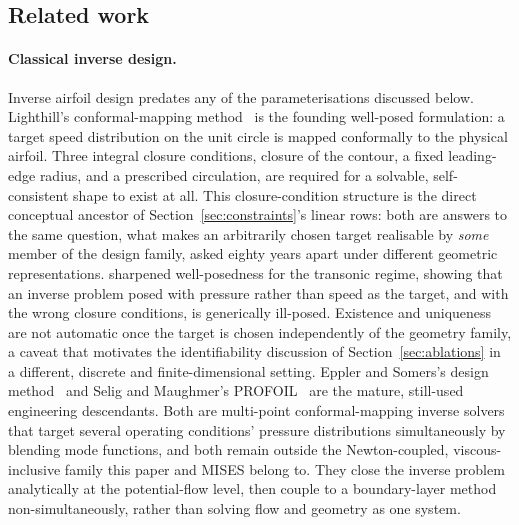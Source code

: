 \subsection{Related work}
\label{sec:related}

\paragraph{Classical inverse design.} Inverse airfoil design predates any of
the parameterisations discussed below. Lighthill's conformal-mapping
method~\citep{lighthill1945new} is the founding well-posed formulation: a
target speed distribution on the unit circle is mapped conformally to the
physical airfoil. Three integral closure conditions, closure of the contour, a
fixed leading-edge radius, and a prescribed circulation, are required for a
solvable, self-consistent shape to exist at all. This closure-condition
structure is the direct conceptual ancestor of
Section~\ref{sec:constraints}'s linear rows: both are answers to the same
question, what makes an arbitrarily chosen target realisable by \emph{some}
member of the design family, asked eighty years apart under different
geometric representations. \citet{volpe1986design} sharpened well-posedness
for the transonic regime, showing that an inverse problem posed with pressure
rather than speed as the target, and with the wrong closure conditions, is
generically ill-posed. Existence and uniqueness are not automatic once the
target is chosen independently of the geometry family, a caveat that motivates
the identifiability discussion of Section~\ref{sec:ablations} in a different,
discrete and finite-dimensional setting. Eppler and Somers's design
method~\citep{eppler1980airfoil} and Selig and Maughmer's
PROFOIL~\citep{selig1992multipoint} are the mature, still-used engineering
descendants. Both are multi-point conformal-mapping inverse solvers that
target several operating conditions' pressure distributions simultaneously by
blending mode functions, and both remain outside the Newton-coupled,
viscous-inclusive family this paper and MISES belong to. They close the
inverse problem analytically at the potential-flow level, then couple to a
boundary-layer method non-simultaneously, rather than solving flow and
geometry as one system.

